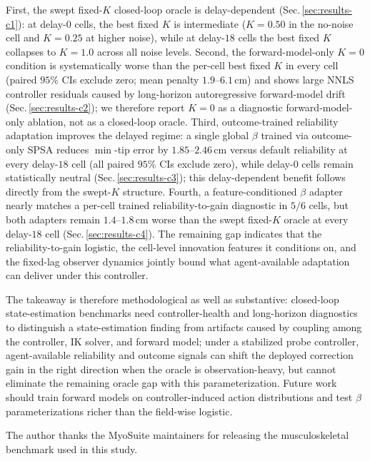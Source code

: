 \documentclass[sn-mathphys,NameDate,iicol]{sn-jnl}
\begin{document}
First, the swept fixed-$K$ closed-loop oracle is delay-dependent
(Sec.\,\ref{sec:results-c1}): at delay-$0$ cells, the best fixed $K$
is intermediate ($K\!=\!0.50$ in the no-noise cell and
$K\!=\!0.25$ at higher noise), while at delay-$18$ cells the best
fixed $K$ collapses to $K\!=\!1.0$ across all noise levels.
Second, the forward-model-only $K\!=\!0$ condition is systematically
worse than the per-cell best fixed $K$ in every cell (paired $95\%$
CIs exclude zero; mean penalty $1.9\text{--}6.1$\,cm) and shows
large NNLS controller residuals caused by long-horizon autoregressive
forward-model drift (Sec.\,\ref{sec:results-c2});
we therefore report $K\!=\!0$ as a diagnostic forward-model-only
ablation, not as a closed-loop oracle.
Third, outcome-trained reliability adaptation improves the delayed
regime: a single global $\beta$ trained via outcome-only SPSA reduces
$\min$-tip error by $1.85\text{--}2.46$\,cm versus default reliability
at every delay-$18$ cell (all paired $95\%$ CIs exclude zero), while
delay-$0$ cells remain statistically neutral
(Sec.\,\ref{sec:results-c3}); this delay-dependent benefit follows
directly from the swept-$K$ structure.
Fourth, a feature-conditioned $\beta$ adapter nearly matches a
per-cell trained reliability-to-gain diagnostic in $5/6$ cells, but
both adapters remain $1.4\text{--}1.8$\,cm worse than the swept
fixed-$K$ oracle at every delay-$18$ cell
(Sec.\,\ref{sec:results-c4}). The remaining gap indicates that the
reliability-to-gain logistic, the cell-level innovation features it
conditions on, and the fixed-lag observer dynamics jointly bound
what agent-available adaptation can deliver under this controller.

The takeaway is therefore methodological as well as substantive:
closed-loop state-estimation benchmarks need controller-health and
long-horizon diagnostics to distinguish a state-estimation finding
from artifacts caused by coupling among the controller, IK solver, and
forward model; under a
stabilized probe controller, agent-available reliability and outcome
signals can shift the deployed correction gain in the right direction
when the oracle is observation-heavy, but cannot eliminate the
remaining oracle gap with this parameterization. Future work should
train forward models on controller-induced action distributions and
test $\beta$ parameterizations richer than the field-wise logistic.

\backmatter

The author thanks the MyoSuite maintainers for releasing the
musculoskeletal benchmark used in this study.
\end{document}
